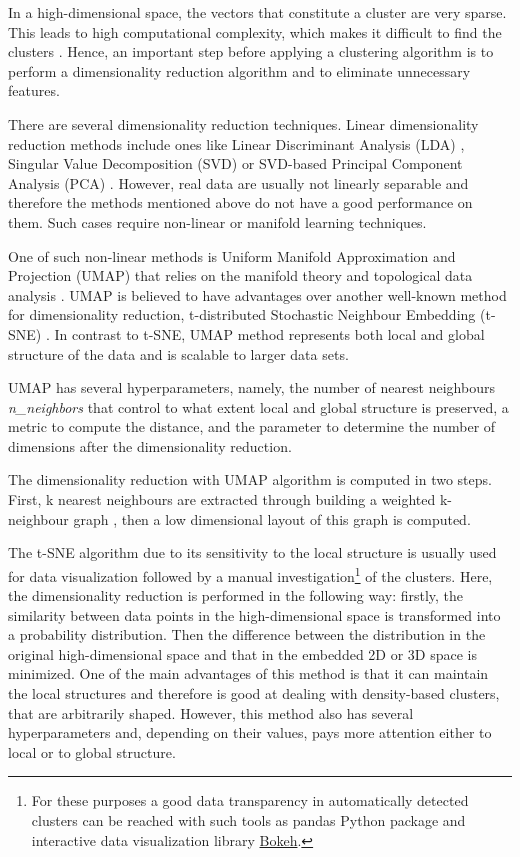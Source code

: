 \documentclass[fontsize=12pt,a4paper,twoside,openany]{scrbook}
\begin{document}
In a high-dimensional space, the vectors that constitute a cluster are very sparse. This leads to high computational complexity, which makes it difficult to find the clusters \parencite{Angelov20}. Hence, an important step before applying a clustering algorithm is to perform a dimensionality reduction algorithm and to eliminate unnecessary features.

There are several dimensionality reduction techniques. Linear dimensionality reduction methods include ones like Linear Discriminant Analysis (LDA) \parencite{Tharwat17}, Singular Value Decomposition (SVD) \parencite{Klema80} or SVD-based Principal Component Analysis (PCA) \parencite{Hotelling33, Jolliffe86}. However, real data are usually not linearly separable and therefore the methods mentioned above do not have a good performance on them. Such cases require non-linear or manifold learning techniques. 

One of such non-linear methods is Uniform Manifold Approximation and Projection (UMAP) that relies on the manifold theory and topological data analysis \parencite{McInnes18, McInnes20}. UMAP is believed to have advantages over another well-known method for dimensionality reduction, t-distributed Stochastic Neighbour Embedding (t-SNE) \parencite{Maaten08}. In contrast to t-SNE, UMAP method represents both local and global structure of the data and is scalable to larger data sets. 

UMAP has several hyperparameters, namely, the number of nearest neighbours \emph{n\_neighbors} that control to what extent local and global structure is preserved, a metric to compute the distance, and the parameter to determine the number of dimensions after the dimensionality reduction.

The dimensionality reduction with UMAP algorithm is computed in two steps. First, k nearest neighbours are extracted through building a weighted k-neighbour graph \parencite{McInnes20}, then a low dimensional layout of this graph is computed.

The t-SNE algorithm due to its sensitivity to the local structure is usually used for data visualization followed by a manual investigation\footnote{For these purposes a good data transparency in automatically detected clusters can be reached with such tools as pandas Python package and interactive data visualization library \href{https://bokeh.org/}{Bokeh}.} of the clusters. Here, the dimensionality reduction is performed in the following way: firstly, the similarity between data points in the high-dimensional space is transformed into a probability distribution. Then the difference between the distribution in the original high-dimensional space and that in the embedded 2D or 3D space is minimized. One of the main advantages of this method is that it can maintain the local structures and therefore is good at dealing with density-based clusters, that are arbitrarily shaped. However, this method also has several hyperparameters and, depending on their values, pays more attention either to local or to global structure.
\end{document}
